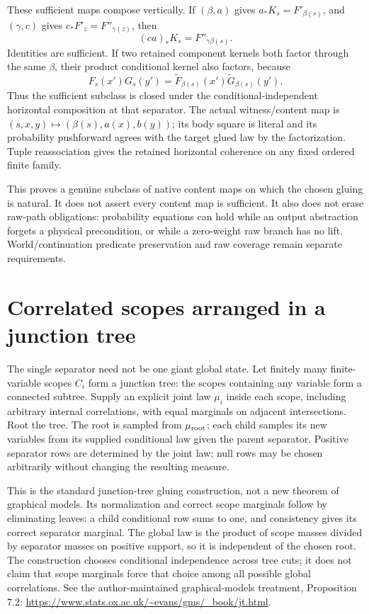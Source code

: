 \documentclass[11pt]{article}
\begin{document}
These sufficient maps compose vertically. If $(\beta,a)$ gives $a_*K_s=F'_{\beta(s)}$, and $(\gamma,c)$ gives $c_*F'_z=F''_{\gamma(z)}$, then
\[
 (ca)_*K_s=F''_{\gamma\beta(s)}.
\]
Identities are sufficient. If two retained component kernels both factor through the same $\beta$, their product conditional kernel also factors, because
\[
 F_s(x')G_s(y')=\widetilde F_{\beta(s)}(x')\widetilde G_{\beta(s)}(y').
\]
Thus the sufficient subclass is closed under the conditional-independent horizontal composition at that separator. The actual witness/content map is $(s,x,y)\mapsto(\beta(s),a(x),b(y))$; its body square is literal and its probability pushforward agrees with the target glued law by the factorization. Tuple reassociation gives the retained horizontal coherence on any fixed ordered finite family.

This proves a genuine subclass of native content maps on which the chosen gluing is natural. It does not assert every content map is sufficient. It also does not erase raw-path obligations: probability equations can hold while an output abstraction forgets a physical precondition, or while a zero-weight raw branch has no lift. World/continuation predicate preservation and raw coverage remain separate requirements.

\section{Correlated scopes arranged in a junction tree}
The single separator need not be one giant global state. Let finitely many finite-variable scopes $C_i$ form a junction tree: the scopes containing any variable form a connected subtree. Supply an explicit joint law $\mu_i$ inside each scope, including arbitrary internal correlations, with equal marginals on adjacent intersections. Root the tree. The root is sampled from $\mu_{\rm root}$; each child samples its new variables from its supplied conditional law given the parent separator. Positive separator rows are determined by the joint law; null rows may be chosen arbitrarily without changing the resulting measure.

This is the standard junction-tree gluing construction, not a new theorem of graphical models. Its normalization and correct scope marginals follow by eliminating leaves: a child conditional row sums to one, and consistency gives its correct separator marginal. The global law is the product of scope masses divided by separator masses on positive support, so it is independent of the chosen root. The construction chooses conditional independence across tree cuts; it does not claim that scope marginals force that choice among all possible global correlations. See the author-maintained graphical-models treatment, Proposition 7.2: \url{https://www.stats.ox.ac.uk/~evans/gms/_book/jt.html}.
\end{document}
